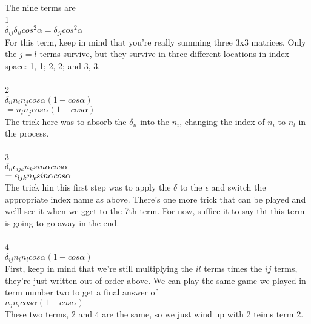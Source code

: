 \documentclass[prb,preprint]
{revtex4-1}
\begin{document}
The nine terms are\\
1\\
$\delta_{ij}\delta_{il}cos^2\alpha = \delta_{jl}cos^2\alpha$\\
For this term, keep in mind that you're really summing three 3x3 matrices.  Only the $j=l$ terms survive, but they survive in three different locations in index space: 1, 1; 2, 2; and 3, 3.\\\\
2\\
$\delta_{il}n_in_j cos\alpha\left(1-cos\alpha\right)$\\
$= n_ln_j cos\alpha\left(1 - cos\alpha\right)$\\
The trick here was to absorb the $\delta_{il}$ into the $n_i$, changing the index of $n_i$ to $n_l$ in the process.\\\\
3\\
$\delta_{il}\epsilon_{ijk}n_k sin\alpha cos\alpha$\\
$=\epsilon_{ljk}n_k\space sin\alpha\space cos\alpha$\\
The trick hin this first step was to apply the $\delta$ to the $\epsilon$ and switch the appropriate index name as above.  There's one more trick that can be played and we'll see it when we gget to the 7th term.  For now, suffice it to say tht this term is going to go away in the end.\\\\
4\\
$\delta_{ij} n_i n_l cos\alpha\left(1 - cos\alpha\right)$\\
First, keep in mind that we're still multiplying the $il$ terms times the $ij$ terms, they're just written out of order above.  We can play the same game we played in term number two to get a final answer of \\
$n_j n_l cos\alpha \left(1 - cos\alpha\right)$\\
These two terms, 2 and 4 are the same, so we just wind up with 2 teims term 2.\\\\
\end{document}
